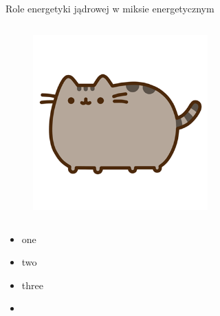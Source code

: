 \begin{columnframe}{Role energetyki jądrowej w miksie energetycznym}
    \begin{column}{0.5\textwidth}
        \begin{figure}
            \centering
            \includegraphics[width=0.6\textwidth, frame]{images/pusheen.png}
        \end{figure}
    \end{column}
    \begin{column}{0.5\textwidth}
        \begin{itemize}
            \item one \keV
            \item two \MeV
            \item three \GeV
            \item \aegis
        \end{itemize}
    \end{column}
\end{columnframe}
